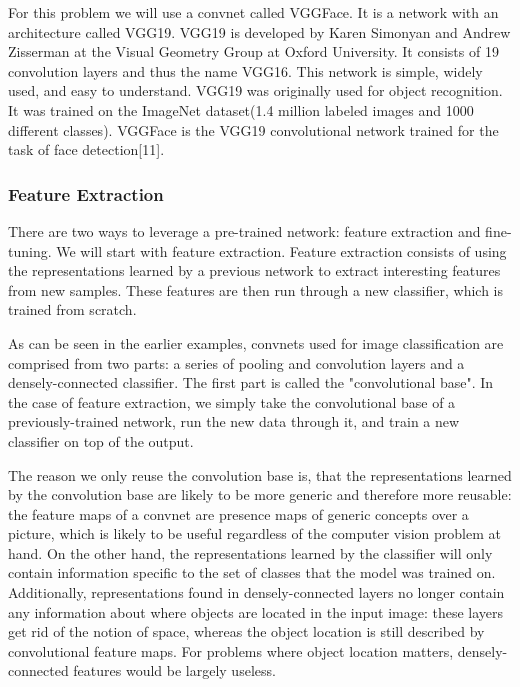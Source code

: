 \documentclass[11pt]{article}
\begin{document}
For this problem we will use a convnet called VGGFace. It is a network
with an architecture called VGG19. VGG19 is developed by Karen Simonyan
and Andrew Zisserman at the Visual Geometry Group at Oxford University.
It consists of 19 convolution layers and thus the name VGG16. This
network is simple, widely used, and easy to understand. VGG19 was
originally used for object recognition. It was trained on the ImageNet
dataset(1.4 million labeled images and 1000 different classes). VGGFace
is the VGG19 convolutional network trained for the task of face
detection{[}11{]}.

    \subsubsection{Feature Extraction}\label{feature-extraction}

    There are two ways to leverage a pre-trained network: feature extraction
and fine-tuning. We will start with feature extraction. Feature
extraction consists of using the representations learned by a previous
network to extract interesting features from new samples. These features
are then run through a new classifier, which is trained from scratch.

As can be seen in the earlier examples, convnets used for image
classification are comprised from two parts: a series of pooling and
convolution layers and a densely-connected classifier. The first part is
called the "convolutional base". In the case of feature extraction, we
simply take the convolutional base of a previously-trained network, run
the new data through it, and train a new classifier on top of the
output.

The reason we only reuse the convolution base is, that the
representations learned by the convolution base are likely to be more
generic and therefore more reusable: the feature maps of a convnet are
presence maps of generic concepts over a picture, which is likely to be
useful regardless of the computer vision problem at hand. On the other
hand, the representations learned by the classifier will only contain
information specific to the set of classes that the model was trained
on. Additionally, representations found in densely-connected layers no
longer contain any information about where objects are located in the
input image: these layers get rid of the notion of space, whereas the
object location is still described by convolutional feature maps. For
problems where object location matters, densely-connected features would
be largely useless.
\end{document}
